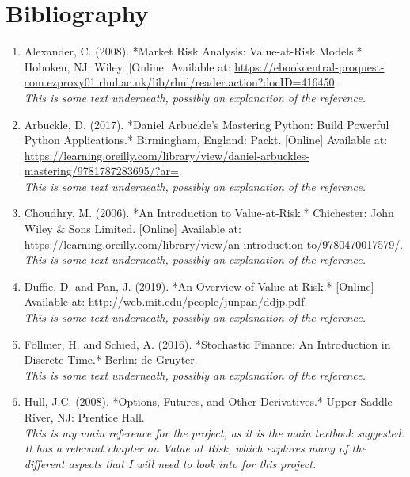 \documentclass{article}
\begin{document}
\section{Bibliography}
\begin{enumerate}
  \item Alexander, C. (2008). *Market Risk Analysis: Value-at-Risk Models.* Hoboken, NJ: Wiley. [Online] Available at: \url{https://ebookcentral-proquest-com.ezproxy01.rhul.ac.uk/lib/rhul/reader.action?docID=416450}.
  \\\textit{This is some text underneath, possibly an explanation of the reference.}
  
  \item Arbuckle, D. (2017). *Daniel Arbuckle’s Mastering Python: Build Powerful Python Applications.* Birmingham, England: Packt. [Online] Available at: \url{https://learning.oreilly.com/library/view/daniel-arbuckles-mastering/9781787283695/?ar=}.
  \\\textit{This is some text underneath, possibly an explanation of the reference.}

  \item Choudhry, M. (2006). *An Introduction to Value-at-Risk.* Chichester: John Wiley \& Sons Limited. [Online] Available at: \\ \url{https://learning.oreilly.com/library/view/an-introduction-to/9780470017579/}.
  \\\textit{This is some text underneath, possibly an explanation of the reference.}
  
  \item Duffie, D. and Pan, J. (2019). *An Overview of Value at Risk.* [Online] Available at: \url{http://web.mit.edu/people/junpan/ddjp.pdf}.
  \\\textit{This is some text underneath, possibly an explanation of the reference.}
  
  \item Föllmer, H. and Schied, A. (2016). *Stochastic Finance: An Introduction in Discrete Time.* Berlin: de Gruyter.
  \\\textit{This is some text underneath, possibly an explanation of the reference.}
  
  \item Hull, J.C. (2008). *Options, Futures, and Other Derivatives.* Upper Saddle River, NJ: Prentice Hall.
  \\\textit{This is my main reference for the project, as it is the main textbook suggested. It has a relevant chapter on Value at Risk, which explores many of the different aspects that I will need to look into for this project.}


\end{enumerate}
\end{document}
